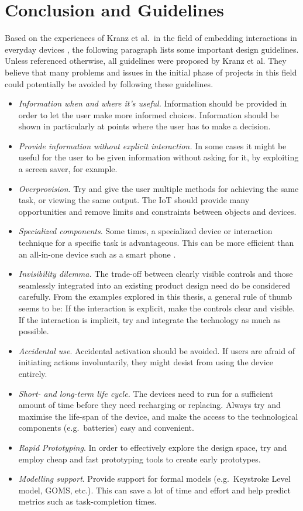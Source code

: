\section{Conclusion and Guidelines}
\label{sec:conclusion}
Based on the experiences of Kranz et al.\ in the field of embedding interactions in everyday devices \cite{kranz10}, the following paragraph lists some important design guidelines.
Unless referenced otherwise, all guidelines were proposed by Kranz et al.
They believe that many problems and issues in the initial phase of projects in this field could potentially be avoided by following these guidelines.
\begin{itemize}
	\item \emph{Information when and where it's useful.} Information should be provided in order to let the user make more informed choices. Information should be shown in particularly at points where the user has to make a decision.
	\item \emph{Provide information without explicit interaction.} In some cases it might be useful for the user to be given information without asking for it, by exploiting a screen saver, for example.
	\item \emph{Overprovision}. Try and give the user multiple methods for achieving the same task, or viewing the same output. The IoT should provide many opportunities and remove limits and constraints between objects and devices.
	\item \emph{Specialized components}. Some times, a specialized device or interaction technique for a specific task is advantageous. This can be more efficient than an all-in-one device such as a smart phone \cite{corsten13,kranz10}.
	\item \emph{Invisibility dilemma.} The trade-off between clearly visible controls and those seamlessly integrated into an existing product design need do be considered carefully. From the examples explored in this thesis, a general rule of thumb seems to be: If the interaction is explicit, make the controls clear and visible. If the interaction is implicit, try and integrate the technology as much as possible.
	\item \emph{Accidental use}. Accidental activation should be avoided. If users are afraid of initiating actions involuntarily, they might desist from using the device entirely.
	\item \emph{Short- and long-term life cycle.} The devices need to run for a sufficient amount of time before they need recharging or replacing. Always try and maximise the life-span of the device, and make the access to the technological components (e.g.\ batteries) easy and convenient.
	\item \emph{Rapid Prototyping}. In order to effectively explore the design space, try and employ cheap and fast prototyping tools to create early prototypes.
	\item \emph{Modelling support}. Provide support for formal models (e.g.\ Keystroke Level model, GOMS, etc.). This can save a lot of time and effort and help predict metrics such as task-completion times.
\end{itemize}





\balancecolumns

